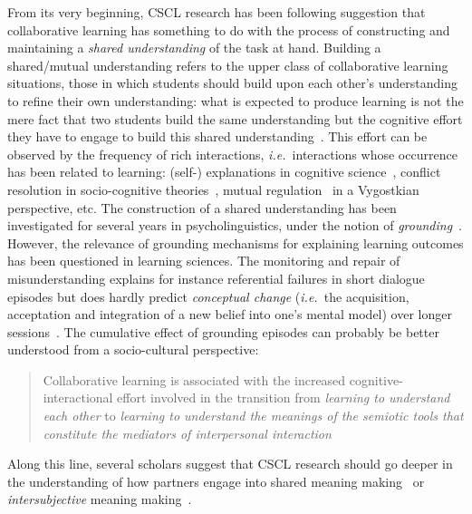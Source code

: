 \documentclass[natbib]{svjour3}
\newcommand{\ie}{{\textit{i.e.\ }}}
\begin{document}
From its very beginning, CSCL research has been following
\citet{roschelle1995construction} suggestion that collaborative learning has
something to do with the process of constructing and maintaining a \emph{shared
understanding} of the task at hand. Building a shared/mutual understanding
refers to the upper class of collaborative learning situations, those in which
students should build upon each other's understanding to refine their own
understanding: what is expected to produce learning is not the mere fact that
two students build the same understanding but the cognitive effort they have to
engage to build this shared understanding~\citep{schwartz1995emergence}. This
effort can be observed by the frequency of rich interactions, \ie interactions
whose occurrence has been related to learning: (self-) explanations in cognitive
science~\citep{chi1989self, webb1991task}, conflict resolution in
socio-cognitive theories~\citep{doise1975social},
mutual regulation~\citep{blaye1995collaborative} in a Vygostkian perspective, etc. The
construction of a shared understanding has been investigated for several years
in psycholinguistics, under the  notion of
\emph{grounding}~\citep{clark1986referring}. However, the relevance of grounding
mechanisms for explaining learning outcomes has been questioned in learning
sciences. The monitoring and repair of misunderstanding explains for instance
referential failures in short dialogue episodes but does hardly predict
\emph{conceptual change} (\ie the acquisition, acceptation and integration of a
new belief into one's mental model) over longer
sessions~\cite{dillenbourg2006sharing}. The cumulative effect of grounding
episodes can probably be better understood from a socio-cultural perspective:

\begin{quote}
Collaborative learning is associated with the increased
cognitive-interactional effort involved in the transition from \emph{learning to
understand each other} to \emph{learning to understand the meanings of the semiotic
tools that constitute the mediators of interpersonal
interaction}~\citep{baker1999role}
\end{quote}

Along this line, several scholars suggest that CSCL research should go deeper in
the understanding of how partners engage into shared meaning
making~\citep{stahl2007meaning} or \emph{intersubjective} meaning
making~\citep{suthers2006technology}.
\end{document}
